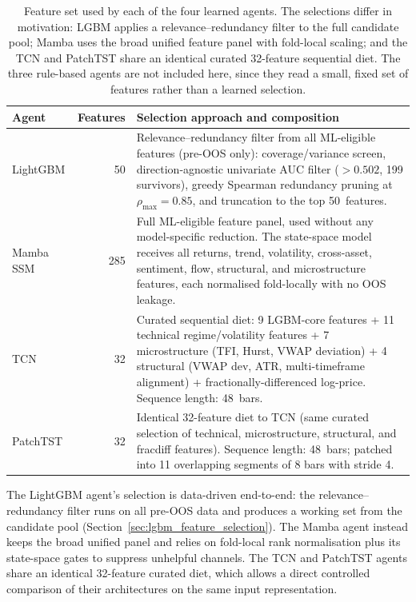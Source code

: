 \begin{table}[h!]
    \centering
    \small
    \caption{Feature set used by each of the four learned agents. The selections differ in motivation: LGBM applies a relevance--redundancy filter to the full candidate pool; Mamba uses the broad unified feature panel with fold-local scaling; and the TCN and PatchTST share an identical curated 32-feature sequential diet. The three rule-based agents are not included here, since they read a small, fixed set of features rather than a learned selection.}
    \label{tab:agent_feature_sets}
    \begin{tabular}{lr>{\raggedright\arraybackslash\hyphenpenalty=10000\exhyphenpenalty=10000}p{7.5cm}}
        \toprule
        \textbf{Agent} & \textbf{Features} & \textbf{Selection approach and composition} \\
        \midrule
        LightGBM & 50 & Relevance--redundancy filter from all ML-eligible features (pre-OOS only): coverage/variance screen, direction-agnostic univariate AUC filter ($> 0.502$, 199 survivors), greedy Spearman redundancy pruning at $\rho_{\max}=0.85$, and truncation to the top 50~features. \\
        Mamba SSM & 285 & Full ML-eligible feature panel, used without any model-specific reduction. The state-space model receives all returns, trend, volatility, cross-asset, sentiment, flow, structural, and microstructure features, each normalised fold-locally with no OOS leakage. \\
        TCN & 32 & Curated sequential diet: 9 LGBM-core features + 11 technical regime/volatility features + 7 microstructure (TFI, Hurst, VWAP deviation) + 4 structural (VWAP dev, ATR, multi-timeframe alignment) + fractionally-differenced log-price. Sequence length: 48~bars. \\
        PatchTST & 32 & Identical 32-feature diet to TCN (same curated selection of technical, microstructure, structural, and fracdiff features). Sequence length: 48~bars; patched into 11 overlapping segments of 8 bars with stride 4. \\
        \bottomrule
    \end{tabular}
\end{table}


The LightGBM agent's selection is data-driven end-to-end: the relevance--redundancy filter runs on all pre-OOS data and produces a working set from the candidate pool (Section~\ref{sec:lgbm_feature_selection}). The Mamba agent instead keeps the broad unified panel and relies on fold-local rank normalisation plus its state-space gates to suppress unhelpful channels. The TCN and PatchTST agents share an identical 32-feature curated diet, which allows a direct controlled comparison of their architectures on the same input representation.


